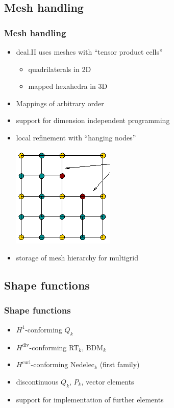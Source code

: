 
\subsection{Mesh handling}
\begin{frame}
  \frametitle{Mesh handling}
  \begin{itemize}
  \item deal.II uses meshes with ``tensor product cells''
    \begin{itemize}
    \item quadrilaterals in 2D
    \item mapped hexahedra in 3D
    \end{itemize}
  \item Mappings of arbitrary order
  \item support for dimension independent programming
  \item local refinement with ``hanging nodes''
    \begin{center}
      \includegraphics[height=.25\textheight]{graph/hanging}
    \end{center}
  \item storage of mesh hierarchy for multigrid
  \end{itemize}
\end{frame}

\subsection{Shape functions}
\begin{frame}
  \frametitle{Shape functions}
  \begin{itemize}
  \item $H^1$-conforming $Q_k$
  \item $H^{\text{div}}$-conforming RT$_k$, BDM$_k$
  \item $H^{\text{curl}}$-conforming Nedelec$_k$ (first family)
  \item discontinuous $Q_k$, $P_k$, vector elements
  \item support for implementation of further elements
  \end{itemize}
\end{frame}


